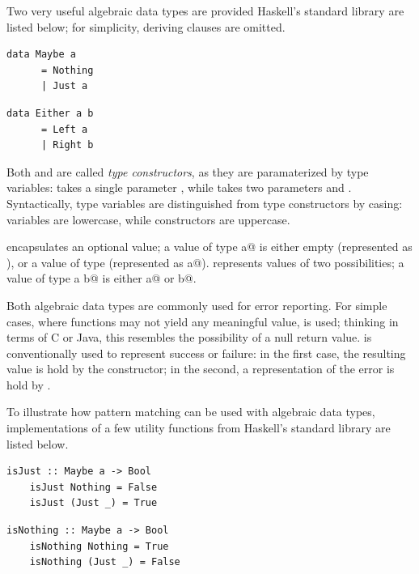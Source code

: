 \documentclass[UdineBachThesis,american,11pt,draft]{PhdThesis}
\begin{document}
  Two very useful algebraic data types are provided Haskell's standard library
  are listed below; for simplicity, deriving clauses are omitted.

  \begin{lstlisting}[gobble=4,basicstyle=\ttfamily\small]
    data Maybe a
      = Nothing
      | Just a
    \end{lstlisting}

    \begin{lstlisting}[gobble=4,basicstyle=\ttfamily\small]
    data Either a b
      = Left a
      | Right b
  \end{lstlisting}

  Both \lstinline@Maybe@ and \lstinline@Either@ are called \emph{type
  constructors}, as they are paramaterized by type variables: \lstinline@Maybe@
  takes a single parameter \lstinline@a@, while \lstinline@Either@ takes two
  parameters \lstinline@a@ and \lstinline@b@. Syntactically, type variables are
  distinguished from type constructors by casing: variables are lowercase, while
  constructors are uppercase.

  \lstinline@Maybe@ encapsulates an optional value; a value of type
  \lstinline@Maybe a@ is either empty (represented as \lstinline@Nothing@), or a
  value of type \lstinline@a@ (represented as \lstinline@Just a@).
  \lstinline@Either@ represents values of two possibilities; a value of type
  \lstinline@Either a b@ is either \lstinline@Left a@ or \lstinline@Right b@.

  Both algebraic data types are commonly used for error reporting. For simple
  cases, where functions may not yield any meaningful value, \lstinline@Maybe@
  is used; thinking in terms of C or Java, this resembles the possibility of a
  null return value. \lstinline@Either@ is conventionally used to represent
  success or failure: in the first case, the resulting value is hold by the
  \lstinline@Right@ constructor; in the second, a representation of the error is
  hold by \lstinline@Left@.

  To illustrate how pattern matching can be used with algebraic data types,
  implementations of a few utility functions from Haskell's standard library
  are listed below.

  \begin{lstlisting}[gobble=4,basicstyle=\ttfamily\small]
    isJust :: Maybe a -> Bool
    isJust Nothing = False
    isJust (Just _) = True
  \end{lstlisting}

  \begin{lstlisting}[gobble=4,basicstyle=\ttfamily\small]
    isNothing :: Maybe a -> Bool
    isNothing Nothing = True
    isNothing (Just _) = False
  \end{lstlisting}
\end{document}
